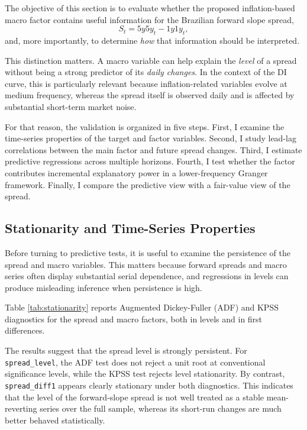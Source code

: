 \documentclass[11pt]{article}
\begin{document}
	The objective of this section is to evaluate whether the proposed inflation-based macro factor contains useful information for the Brazilian forward slope spread,
	\[
	S_t = 5y5y_t - 1y1y_t,
	\]
	and, more importantly, to determine \emph{how} that information should be interpreted.
	
	This distinction matters. A macro variable can help explain the \emph{level} of a spread without being a strong predictor of its \emph{daily changes}. In the context of the DI curve, this is particularly relevant because inflation-related variables evolve at medium frequency, whereas the spread itself is observed daily and is affected by substantial short-term market noise.
	
	For that reason, the validation is organized in five steps. First, I examine the time-series properties of the target and factor variables. Second, I study lead-lag correlations between the main factor and future spread changes. Third, I estimate predictive regressions across multiple horizons. Fourth, I test whether the factor contributes incremental explanatory power in a lower-frequency Granger framework. Finally, I compare the predictive view with a fair-value view of the spread.
	
	\subsection{Stationarity and Time-Series Properties}
	\label{subsec:stationarity_properties}
	
	Before turning to predictive tests, it is useful to examine the persistence of the spread and macro variables. This matters because forward spreads and macro series often display substantial serial dependence, and regressions in levels can produce misleading inference when persistence is high.
	
	Table \ref{tab:stationarity} reports Augmented Dickey-Fuller (ADF) and KPSS diagnostics for the spread and macro factors, both in levels and in first differences.
	
	\begin{table}[H]
		\centering
		\footnotesize
		\resizebox{\textwidth}{!}{
			
		}
		\caption{Stationarity diagnostics for the target spread and macro factors.}
		\label{tab:stationarity}
	\end{table}
	
The results suggest that the spread level is strongly persistent. For \texttt{spread\_level}, the ADF test does not reject a unit root at conventional significance levels, while the KPSS test rejects level stationarity. By contrast, \texttt{spread\_diff1} appears clearly stationary under both diagnostics. This indicates that the level of the forward-slope spread is not well treated as a stable mean-reverting series over the full sample, whereas its short-run changes are much better behaved statistically.
\end{document}
